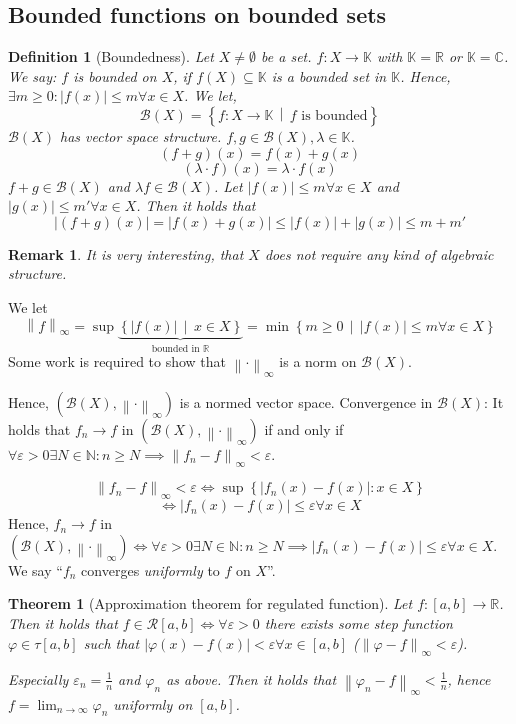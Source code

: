 \documentclass{article}
\newtheorem{theorem}{Theorem}  \numberwithin{theorem}{section}
\newtheorem{definition}{Definition}  \numberwithin{definition}{section}
\newtheorem{remark}{Remark}  \numberwithin{remark}{section}
\newcommand{\set}[1]{\left\{#1\right\}}
\newcommand{\setdef}[2]{\left\{\left.#1\,\middle|\,#2\right.\right\}}
\newcommand{\norm}[1]{\left\|#1\right\|}
\newcommand{\card}[1]{\left|#1\right|}
\begin{document}
\subsection{Bounded functions on bounded sets}

\begin{definition}[Boundedness] %
  Let $X \neq \emptyset$ be a set.
  $f: X \to \mathbb K$ with $\mathbb K = \mathbb R$ or $\mathbb K = \mathbb C$.
  We say: $f$ is bounded on $X$, if $f(X) \subseteq \mathbb K$ is a bounded set in $\mathbb K$.
  Hence, $\exists m \geq 0: \card{f(x)} \leq m \forall x \in X$.
  We let,
  \[ \mathcal B(X) = \setdef{f: X \to \mathbb K}{f \text{ is bounded}} \]
  $\mathcal B(X)$ has vector space structure.
  $f, g \in \mathcal B(X), \lambda \in \mathbb K$.
  \[ (f + g)(x) = f(x) + g(x) \]
  \[ (\lambda \cdot f)(x) = \lambda \cdot f(x) \]
  $f + g \in \mathcal B(X)$ and $\lambda f \in \mathcal B(X)$.
  Let $\card{f(x)} \leq m \forall x \in X$ and $\card{g(x)} \leq m' \forall x \in X$.
  Then it holds that
  \[ \card{(f + g)(x)} = \card{f(x) + g(x)} \leq \card{f(x)} + \card{g(x)} \leq m + m' \]
\end{definition}

\begin{remark}
  It is very interesting, that $X$ does not require any kind of algebraic structure.
\end{remark}

We let
\[
  \norm{f}_{\infty}
  = \sup\underbrace{\setdef{\card{f(x)}}{x \in X}}_{\text{bounded in } \mathbb R}
  = \min\setdef{m \geq 0}{\card{f(x)} \leq m \forall x \in X}
\]
Some work is required to show that $\norm{\cdot}_{\infty}$ is a norm on $\mathcal B(X)$.

Hence, $(\mathcal B(X), \norm{\cdot}_{\infty})$ is a normed vector space.
Convergence in $\mathcal B(X)$: It holds that $f_n \to f$ in $(\mathcal B(X), \norm{\cdot}_{\infty})$
if and only if $\forall \varepsilon > 0 \exists N \in \mathbb N: n \geq N \implies \norm{f_n - f}_{\infty} < \varepsilon$.

\[ \norm{f_n - f}_{\infty} < \varepsilon \iff \sup\set{\card{f_n(x) - f(x)}: x \in X} \]
\[ \iff \card{f_n(x) - f(x)} \leq \varepsilon \forall x \in X \]
Hence, $f_n \to f$ in $(\mathcal B(X), \norm{\cdot}_{\infty}) \iff \forall \varepsilon > 0 \exists N \in \mathbb N: n \geq N \implies \card{f_n(x) - f(x)} \leq \varepsilon \forall x \in X$.
We say \enquote{$f_n$ converges \emph{uniformly} to $f$ on $X$}.

\begin{theorem}[Approximation theorem for regulated function] %
  \label{approxthmreg}
  Let $f: [a, b] \to \mathbb R$. Then it holds that $f \in \mathcal R[a,b] \iff \forall \varepsilon > 0$ there exists some step function $\varphi \in \tau[a,b]$ such that $\card{\varphi(x) - f(x)} < \varepsilon \forall x \in [a,b]$ ($\norm{\varphi - f}_{\infty} < \varepsilon$).

  Especially $\varepsilon_n = \frac1n$ and $\varphi_n$ as above.
  Then it holds that $\norm{\varphi_n - f}_{\infty} < \frac1n$, hence $f = \lim_{n\to\infty} \varphi_n$ uniformly on $[a,b]$.
\end{theorem}
\end{document}

